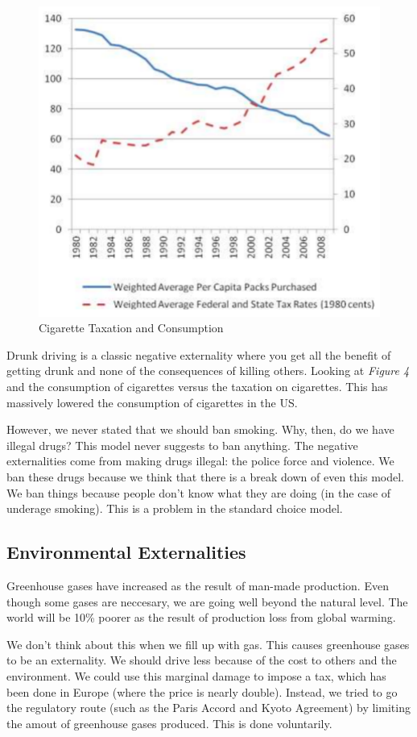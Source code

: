 \documentclass{article}
\begin{document}
\begin{figure}[H]
    \centering
    \includegraphics[scale=0.75]{"Cigarette Taxation and Consumption"}
    \caption{Cigarette Taxation and Consumption}
\end{figure}

Drunk driving is a classic negative externality where you get all the benefit of
getting drunk and none of the consequences of killing others. Looking at
\textit{Figure 4} and the consumption of cigarettes versus the taxation on
cigarettes. This has massively lowered the consumption of cigarettes in the US.

However, we never stated that we should ban smoking. Why, then, do we have
illegal drugs? This model never suggests to ban anything. The negative
externalities come from making drugs illegal: the police force and violence. We
ban these drugs because we think that there is a break down of even this model.
We ban things because people don't know what they are doing (in the case of
underage smoking). This is a problem in the standard choice model.

\subsection{ Environmental Externalities }

Greenhouse gases have increased as the result of man-made production. Even
though some gases are neccesary, we are going well beyond the natural level. The
world will be 10\% poorer as the result of production loss from global warming. 

We don't think about this when we fill up with gas. This causes greenhouse gases
to be an externality. We should drive less because of the cost to others and the
environment. We could use this marginal damage to impose a tax, which has been
done in Europe (where the price is nearly double). Instead, we tried to go the
regulatory route (such as the Paris Accord and Kyoto Agreement) by limiting the
amout of greenhouse gases produced. This is done voluntarily. 
\end{document}
